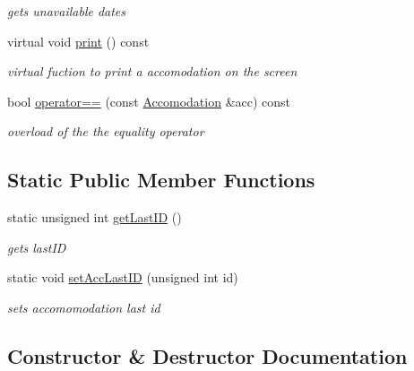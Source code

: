 \begin{DoxyCompactItemize}
\begin{DoxyCompactList}\small\item\em gets unavailable dates \end{DoxyCompactList}\item 
\hypertarget{class_accomodation_ac38668edd6b7cd608dc9e8ab9a780efb}{}\label{class_accomodation_ac38668edd6b7cd608dc9e8ab9a780efb} 
virtual void \hyperlink{class_accomodation_ac38668edd6b7cd608dc9e8ab9a780efb}{print} () const
\begin{DoxyCompactList}\small\item\em virtual fuction to print a accomodation on the screen \end{DoxyCompactList}\item 
bool \hyperlink{class_accomodation_ae42299afc3f8bf211fe69821f876d48a}{operator==} (const \hyperlink{class_accomodation}{Accomodation} \&acc) const
\begin{DoxyCompactList}\small\item\em overload of the the equality operator \end{DoxyCompactList}\end{DoxyCompactItemize}
\subsection*{Static Public Member Functions}
\begin{DoxyCompactItemize}
\item 
static unsigned int \hyperlink{class_accomodation_a2ceca7929ed995f3fdc40e3d6b7e017c}{get\+Last\+ID} ()
\begin{DoxyCompactList}\small\item\em gets last\+ID \end{DoxyCompactList}\item 
static void \hyperlink{class_accomodation_a5554cdc8b46ae1fb92c94bf4696f9b77}{set\+Acc\+Last\+ID} (unsigned int id)
\begin{DoxyCompactList}\small\item\em sets accomomodation last id \end{DoxyCompactList}\end{DoxyCompactItemize}


\subsection{Constructor \& Destructor Documentation}
\hypertarget{class_accomodation_a6f9d474e6bf2cd77d0046c3584a50bc6}{}\label{class_accomodation_a6f9d474e6bf2cd77d0046c3584a50bc6} 

